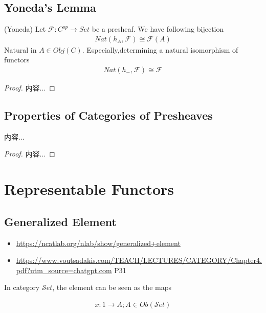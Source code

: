 \documentclass[Total.tex]{subfiles}
\begin{document}
			\subsection{Yoneda's Lemma}
			
			\begin{theorem}
				(Yoneda) Let $\mathcal{F}:C^{op}\rightarrow Set$ be a presheaf. We have following bijection
				\begin{gather*}
					Nat(h_A,\mathcal{F})\cong\mathcal{F}(A)
				\end{gather*}
				Natural in $A\in Obj(C)$. Especially,determining a natural isomorphism of functors
				\begin{gather*}
					Nat(h_{-},\mathcal{F})\cong \mathcal{F}
				\end{gather*}
			\end{theorem}
			\begin{proof}
				内容...
			\end{proof}
			\subsection{Properties of Categories of Presheaves}
			\begin{proposition}
				内容...
			\end{proposition}
			\begin{proof}
				内容...
			\end{proof}
		
		\section{Representable Functors}
		
		\subsection{Generalized Element}
		
		\begin{itemize}
			\item 	\url{https://ncatlab.org/nlab/show/generalized+element}
			
			\item \url{https://www.voutsadakis.com/TEACH/LECTURES/CATEGORY/Chapter4.pdf?utm_source=chatgpt.com} P31
		\end{itemize}
		
		In category ${\mathcal Set}$, the element can be seen as the maps
		
		\begin{gather*}
			x:1\rightarrow A;A\in Ob({\mathcal Set})
		\end{gather*}
		
\end{document}

